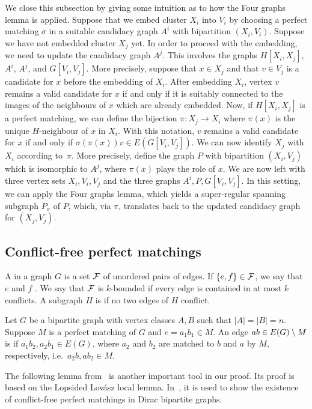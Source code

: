 \documentclass[10pt]{amsart}
\theoremstyle{definition}
\theoremstyle{claimstyle}
\theoremstyle{stepstyle}
\numberwithin{equation}{section}
\begin{document}
We close this subsection by giving some intuition as to how the Four graphs lemma is applied. Suppose that we embed cluster $X_i$ into $V_i$ by choosing a perfect matching $\sigma$ in a suitable candidacy graph $A^i$ with bipartition $(X_i,V_i)$. Suppose we have not embedded cluster $X_j$ yet. In order to proceed with the embedding, we need to update the candidacy graph $A^j$. This involves the graphs $H[X_i,X_j]$, $A^i$, $A^j$, and $G[V_i,V_j]$. More precisely, suppose that $x\in X_j$ and that $v\in V_j$ is a candidate for $x$ before the embedding of $X_i$. After embedding $X_i$, vertex $v$ remains a valid candidate for $x$ if and only if it is suitably connected to the images of the neighbours of $x$ which are already embedded. Now, if $H[X_i,X_j]$ is a perfect matching, we can define the bijection $\pi\colon X_j\to X_i$ where $\pi(x)$ is the unique $H$-neighbour of $x$ in $X_i$. With this notation, $v$ remains a valid candidate for $x$ if and only if $\sigma(\pi(x))v\in E(G[V_i,V_j])$. We can now identify $X_j$ with $X_i$ according to~$\pi$. More precisely, define the graph $P$ with bipartition $(X_i,V_j)$ which is isomorphic to $A^j$, where $\pi(x)$ plays the role of $x$. We are now left with three vertex sets $X_i,V_i,V_j$ and the three graphs $A^i,P,G[V_i,V_j]$. In this setting, we can apply the Four graphs lemma, which yields a super-regular spanning subgraph $P_\sigma$ of $P$, which, via $\pi$, translates back to the updated candidacy graph for $(X_j,V_j)$.


\subsection{Conflict-free perfect matchings}\label{sec:conflictM}

A  in a graph $G$ is a set $\mathcal{F}$ of unordered pairs of edges. If $\{e,f\}\in \mathcal{F}$, we say that $e$ and $f$ . We say that $\mathcal{F}$ is $k$-bounded if every edge is contained in at most $k$ conflicts. A subgraph $H$ is  if no two edges of $H$ conflict.

Let $G$ be a bipartite graph with vertex classes $A,B$ such that $|A|=|B|=n$. Suppose $M$ is a perfect matching of $G$ and $e=a_1b_1\in M$. An edge $ab\in E(G)\setminus M$ is  if $a_1b_2,a_2 b_1\in E(G)$, where $a_2$ and $b_2$ are matched to $b$ and $a$ by $M$, respectively, i.e.~$a_2b,ab_2\in M$.


The following lemma from~\cite{CP:17} is another important tool in our proof. Its proof is based on the Lopsided Lov\'asz local lemma. In~\cite{CP:17}, it is used to show the existence of conflict-free perfect matchings in Dirac bipartite graphs.
\end{document}
